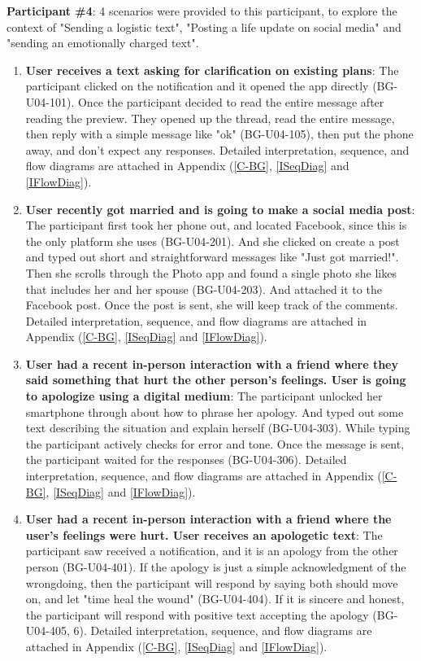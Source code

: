 \documentclass[acmsmall,screen,authorversion,nonacm]{acmart}
\begin{document}
\textbf{Participant \#4}: 4 scenarios were provided to this participant, to explore the context of "Sending a logistic text", "Posting a life update on social media" and "sending an emotionally charged text".

\begin{center}
\begin{enumerate}
    \item \textbf{User receives a text asking for clarification on existing plans}: The participant clicked on the notification and it opened the app directly (BG-U04-101). Once the participant decided to read the entire message after reading the preview. They opened up the thread, read the entire message, then reply with a simple message like "ok" (BG-U04-105), then put the phone away, and don't expect any responses. Detailed interpretation, sequence, and flow diagrams are attached in Appendix (\ref{C-BG}, \ref{ISeqDiag} and \ref{IFlowDiag}). 
    
    \item \textbf{User recently got married and is going to make a social media post}: The participant first took her phone out, and located Facebook, since this is the only platform she uses (BG-U04-201). And she clicked on create a post and typed out short and straightforward messages like "Just got married!". Then she scrolls through the Photo app and found a single photo she likes that includes her and her spouse (BG-U04-203). And attached it to the Facebook post. Once the post is sent, she will keep track of the comments. Detailed interpretation, sequence, and flow diagrams are attached in Appendix (\ref{C-BG}, \ref{ISeqDiag} and \ref{IFlowDiag}). 
    
    \item \textbf{User had a recent in-person interaction with a friend where they said something that hurt the other person’s feelings. User is going to apologize using a digital medium}: The participant unlocked her smartphone through about how to phrase her apology. And typed out some text describing the situation and explain herself (BG-U04-303). While typing the participant actively checks for error and tone. Once the message is sent, the participant waited for the responses (BG-U04-306). Detailed interpretation, sequence, and flow diagrams are attached in Appendix (\ref{C-BG}, \ref{ISeqDiag} and \ref{IFlowDiag}). 
    
    \item \textbf{User had a recent in-person interaction with a friend where the user’s feelings were hurt. User receives an apologetic text}: The participant saw received a notification, and it is an apology from the other person (BG-U04-401). If the apology is just a simple acknowledgment of the wrongdoing, then the participant will respond by saying both should move on, and let "time heal the wound" (BG-U04-404). If it is sincere and honest, the participant will respond with positive text accepting the apology (BG-U04-405, 6). Detailed interpretation, sequence, and flow diagrams are attached in Appendix (\ref{C-BG}, \ref{ISeqDiag} and \ref{IFlowDiag}). 
\end{enumerate}
\end{center}
\end{document}
